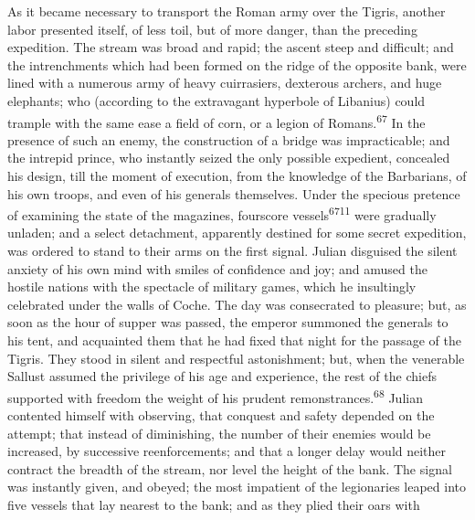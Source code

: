 
As it became necessary to transport the Roman army over the
Tigris, another labor presented itself, of less toil, but of more
danger, than the preceding expedition. The stream was broad and
rapid; the ascent steep and difficult; and the intrenchments
which had been formed on the ridge of the opposite bank, were
lined with a numerous army of heavy cuirrasiers, dexterous
archers, and huge elephants; who (according to the extravagant
hyperbole of Libanius) could trample with the same ease a field
of corn, or a legion of Romans.\textsuperscript{67} In the presence of such an
enemy, the construction of a bridge was impracticable; and the
intrepid prince, who instantly seized the only possible
expedient, concealed his design, till the moment of execution,
from the knowledge of the Barbarians, of his own troops, and even
of his generals themselves. Under the specious pretence of
examining the state of the magazines, fourscore vessels\textsuperscript{6711} were
gradually unladen; and a select detachment, apparently destined
for some secret expedition, was ordered to stand to their arms on
the first signal. Julian disguised the silent anxiety of his own
mind with smiles of confidence and joy; and amused the hostile
nations with the spectacle of military games, which he
insultingly celebrated under the walls of Coche. The day was
consecrated to pleasure; but, as soon as the hour of supper was
passed, the emperor summoned the generals to his tent, and
acquainted them that he had fixed that night for the passage of
the Tigris. They stood in silent and respectful astonishment;
but, when the venerable Sallust assumed the privilege of his age
and experience, the rest of the chiefs supported with freedom the
weight of his prudent remonstrances.\textsuperscript{68} Julian contented himself
with observing, that conquest and safety depended on the attempt;
that instead of diminishing, the number of their enemies would be
increased, by successive reenforcements; and that a longer delay
would neither contract the breadth of the stream, nor level the
height of the bank. The signal was instantly given, and obeyed;
the most impatient of the legionaries leaped into five vessels
that lay nearest to the bank; and as they plied their oars with
